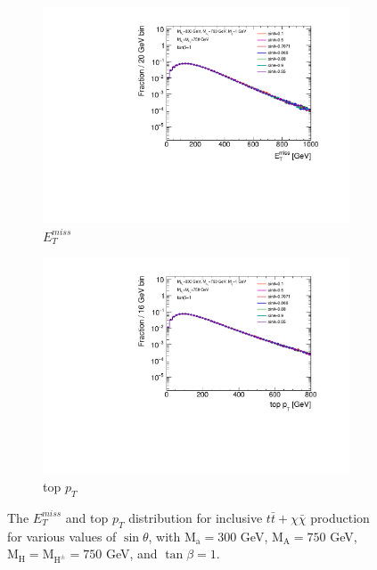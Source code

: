 \begin{figure}
  \centering
  \begin{subfigure}[b]{0.49\textwidth}
    \includegraphics[width=\textwidth]{texinputs/04_grid/figures/DMHF/benchmarking/MDM_1_Ma_300_MA_750_tanb_1.0_SCAN_sinp_v2/metlog.pdf}
    \caption{$E_{T}^{miss}$}
  \end{subfigure}
  \begin{subfigure}[b]{0.49\textwidth}
    \includegraphics[width=\textwidth]{texinputs/04_grid/figures/DMHF/benchmarking/MDM_1_Ma_300_MA_750_tanb_1.0_SCAN_sinp_v2/topptlog.pdf}
    \caption{top $p_{T}$}
  \end{subfigure}
  \caption{The $E_{T}^{miss}$ and top $p_{T}$ distribution for inclusive $t\bar{t}+\chi\bar{\chi}$ production for various values of $\sin\theta$, with $\mathrm{M_a}=300$ GeV, $\mathrm{M_A}=750$ GeV, $\mathrm{M_H}=\mathrm{M_{H^{\pm}}}=750$ GeV, and $\tan\beta=1$.}
  \label{fig:kin_sinp}
\end{figure}

